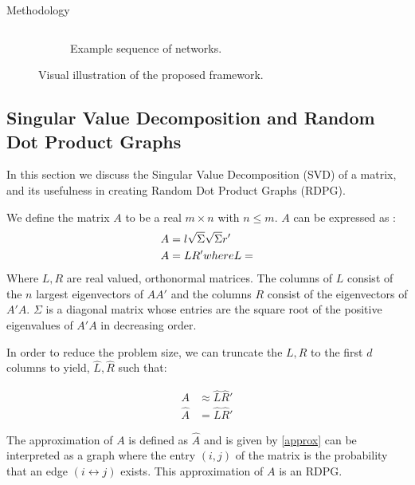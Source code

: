 \documentclass[12pt]{amsart}
\begin{document}
\begin{section}{Methodology}
\begin{figure}
\begin{subfigure}[c]{1\textwidth}
\begin{tabular}{llll}
                \end{tabular}
                \caption{Example sequence of networks.}
                \label{method nets}
                
            \end{subfigure}

            \caption{Visual illustration of the proposed framework.}
            \label{framework illustration}
        \end{figure} 

    \subsection{Singular Value Decomposition and Random Dot Product Graphs}
            \label{svd}
            In this section we discuss the Singular Value Decomposition (SVD) of a matrix, and its usefulness in creating Random Dot Product Graphs (RDPG).

            We define the matrix $A$ to be a real $m \times n$ with $n \le m$. $A$ can be expressed as \cite{forsythe1967computer}:
            \begin{align}
                A&=l\sqrt{\Sigma} \sqrt{\Sigma} r' \\
                A&=L R' \space where L=
            \end{align}
            Where $L, R$ are real valued, orthonormal matrices. The columns of $L$ consist of the $n$ largest eigenvectors of $AA'$ and the columns $R$ consist of the eigenvectors of $A'A$. $\Sigma$ is a diagonal matrix whose entries are the square root of the positive eigenvalues of $A'A$ in decreasing order.

            In order to reduce the problem size, we can truncate the $L,R$ to the first $d$ columns to yield, $\hat L, \hat R$ such that:

            \begin{align}
                A &\approx \hat L \hat R' \\
                \hat A &= \hat L \hat R'
                \label{approx}
            \end{align}


            The approximation of $A$ is defined as $\hat A$ and is given by \autoref{approx} can be interpreted as a graph where the entry $(i,j)$ of the matrix is the probability that an edge $(i \leftrightarrow j)$ exists. This approximation of $A$ is an RDPG\cite{athreya2017statistical}.
     

\end{section}
\end{document}
